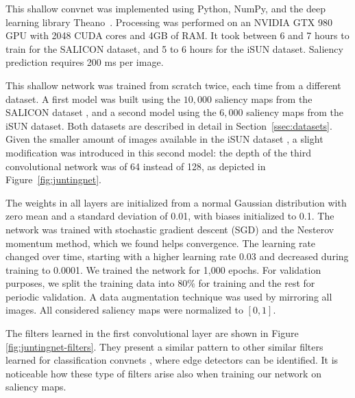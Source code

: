 \documentclass[10pt,twocolumn,letterpaper]{article}
\begin{document}
This shallow convnet was implemented using Python, NumPy, and the deep learning library Theano~\cite{bergstra2010theano, bastien2012theano}. 
Processing was performed on an NVIDIA GTX 980 GPU with 2048 CUDA cores and 4GB of RAM. 
It took between 6 and 7 hours to train for the SALICON dataset, and 5 to 6 hours for the iSUN dataset.
Saliency prediction requires 200 ms per image.


This shallow network was trained from scratch twice, each time from a different dataset. 
A first model was built using the $10,000$ saliency maps from the SALICON dataset \cite{jiang2015salicon}, and a second model using the $6,000$ saliency maps from the iSUN dataset.
Both datasets are described in detail in Section~\ref{ssec:datasets}.
Given the smaller amount of images available in the iSUN dataset \cite{xu2015turkergaze}, a slight modification was introduced in this second model:
the depth of the third convolutional network was of 64 instead of 128, as depicted in Figure~\ref{fig:juntingnet}.

The weights in all layers are initialized from a normal Gaussian distribution with zero mean and a standard deviation of 0.01, with biases initialized to 0.1.
The network was trained with stochastic gradient descent (SGD) and the Nesterov momentum method, which we found helps convergence. 
The learning rate changed over time, starting with a higher learning rate 0.03 and decreased during training to 0.0001. 
We trained the network for 1,000 epochs.
For validation purposes, we split the training data into 80\% for training and the rest for periodic validation. 
A data augmentation technique was used by mirroring all images. All considered saliency maps were normalized to $[0,1]$.

The filters learned in the first convolutional layer are shown in Figure \ref{fig:juntingnet-filters}.
They present a similar pattern to other similar filters learned for classification convnets \cite{zeiler2014visualizing, zeiler2014visualizing}, where edge detectors can be identified.
It is noticeable how these type of filters arise also when training our network on saliency maps.
\end{document}
